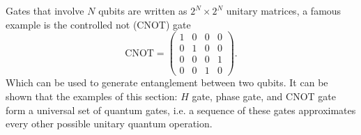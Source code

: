 Gates that involve $N$ qubits are written as $2^N\times 2^N$ unitary matrices, a famous example is the controlled not (CNOT) gate
\begin{equation}
\text{CNOT} = \begin{pmatrix}
1  & 0 & 0 & 0\\
0 & 1 & 0 & 0\\
0 & 0& 0 & 1 \\
0 & 0 & 1 &0
\end{pmatrix}.
\end{equation}
Which can be used to generate entanglement between two qubits. It can be shown \cite{chuang} that the examples of this section: $H$ gate, phase gate, and CNOT gate form a universal set of quantum gates, i.e. a sequence of these gates approximates every other possible unitary quantum operation.

